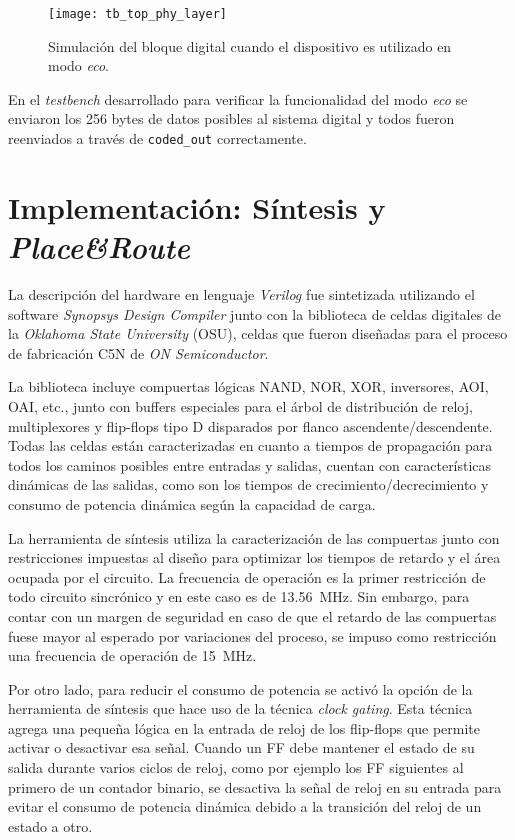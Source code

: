 \begin{figure}
	\centering
	\texttt{[image: tb\_top\_phy\_layer]}
	\caption{Simulación del bloque digital cuando el dispositivo es 
	utilizado en modo \emph{eco}.}
	\label{fig:SimulacionDigital}
\end{figure}

En el \emph{testbench} desarrollado para verificar la funcionalidad 
del modo \emph{eco} se enviaron los 256 bytes de datos posibles al 
sistema digital y todos fueron reenviados a través de 
\lstinline{coded_out} correctamente.

\section{Implementación: Síntesis y \emph{Place\&Route}}

La descripción del hardware en lenguaje \emph{Verilog} fue 
sintetizada utilizando el software \emph{Synopsys Design Compiler} 
\cite{SynopsysDC} junto con la biblioteca de celdas digitales de la 
\emph{Oklahoma State University} (OSU), celdas que fueron diseñadas 
para el proceso de fabricación C5N de \emph{ON Semiconductor}. 

La biblioteca incluye compuertas lógicas NAND, NOR, XOR, inversores, 
AOI, OAI, etc., junto con buffers especiales para el árbol de 
distribución de reloj, multiplexores y flip-flops tipo D disparados 
por flanco ascendente/descendente. 
Todas las celdas están caracterizadas en cuanto a tiempos de 
propagación para todos los caminos posibles entre entradas y 
salidas, cuentan con características dinámicas de las salidas, como 
son los tiempos de crecimiento/decrecimiento y consumo de potencia 
dinámica según la capacidad de carga.

La herramienta de síntesis utiliza la caracterización de las 
compuertas junto con restricciones impuestas al diseño para 
optimizar los tiempos de retardo y el área ocupada por el circuito. 
La frecuencia de operación es la primer restricción de todo circuito 
sincrónico y en este caso es de \SI{13.56}{\mega\hertz}. Sin embargo, 
para contar con un margen de seguridad en caso de que el retardo de 
las compuertas fuese mayor al esperado por variaciones del proceso, se impuso como restricción una 
frecuencia de operación de \SI{15}{\mega\hertz}. 

Por otro lado, para reducir el consumo de potencia se activó la 
opción de la herramienta de síntesis que hace uso de la técnica 
\emph{clock gating}. Esta técnica agrega una pequeña lógica en la entrada 
de reloj de los flip-flops que permite activar o desactivar esa señal. 
Cuando un FF debe mantener el estado de su salida durante varios ciclos
de reloj, como por ejemplo los FF siguientes al primero de un contador 
binario, se desactiva la señal de reloj en su entrada para evitar el consumo de 
potencia dinámica debido a la transición del reloj de un estado a otro.

